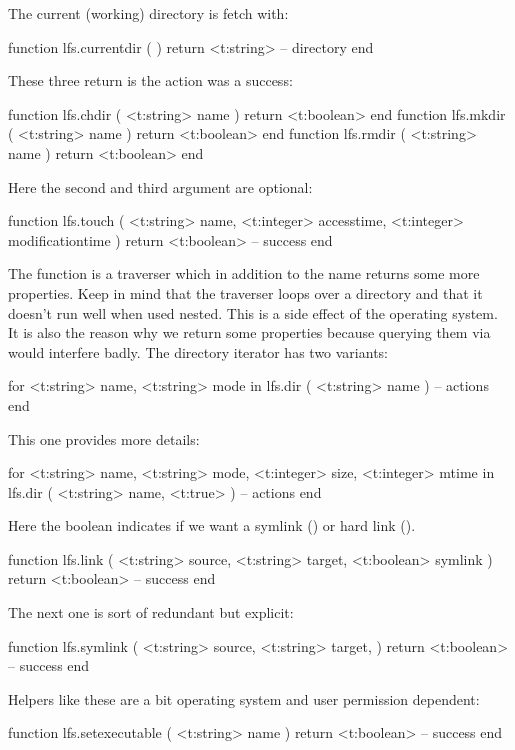 The current (working) directory is fetch with:

\starttyping[option=LUA]
function lfs.currentdir ( )
    return <t:string> -- directory
end
\stoptyping

These three return  is the action was a success:

\starttyping[option=LUA]
function lfs.chdir ( <t:string> name ) return <t:boolean> end
function lfs.mkdir ( <t:string> name ) return <t:boolean> end
function lfs.rmdir ( <t:string> name ) return <t:boolean> end
\stoptyping

Here the second and third argument are optional:

\starttyping[option=LUA]
function lfs.touch (
    <t:string>  name,
    <t:integer> accesstime,
    <t:integer> modificationtime
)
    return <t:boolean> -- success
end
\stoptyping

The  function is a traverser which in addition to the name returns
some more properties. Keep in mind that the traverser loops over a directory and
that it doesn't run well when used nested. This is a side effect of the operating
system. It is also the reason why we return some properties because querying them
via  would interfere badly. The directory iterator has two
variants:

\starttyping[option=LUA]
for
    <t:string> name,
    <t:string> mode
in lfs.dir (
    <t:string> name
)
    -- actions
end
\stoptyping

This one provides more details:

\starttyping[option=LUA]
for
    <t:string>  name,
    <t:string>  mode,
    <t:integer> size,
    <t:integer> mtime
in lfs.dir (
    <t:string>  name,
    <t:true>
)
    -- actions
end
\stoptyping

Here the boolean indicates if we want a symlink () or hard link
().

\starttyping[option=LUA]
function lfs.link (
    <t:string>  source,
    <t:string>  target,
    <t:boolean> symlink
)
    return <t:boolean> -- success
end
\stoptyping

The next one is sort of redundant but explicit:

\starttyping[option=LUA]
function lfs.symlink (
    <t:string>  source,
    <t:string>  target,
)
    return <t:boolean> -- success
end
\stoptyping

Helpers like these are a bit operating system and user permission dependent:

\starttyping[option=LUA]
function lfs.setexecutable ( <t:string> name )
    return <t:boolean> -- success
end
\stoptyping


